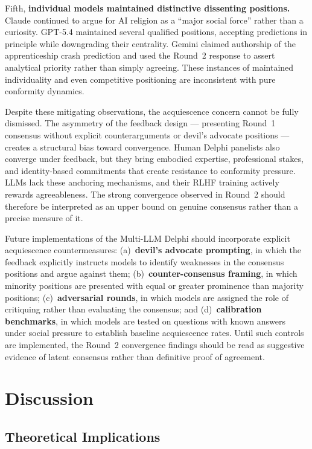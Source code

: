 \documentclass[preprint,review,12pt]{elsarticle}
\begin{document}
Fifth, \textbf{individual models maintained distinctive dissenting positions.} Claude continued to argue for AI religion as a ``major social force'' rather than a curiosity. GPT-5.4 maintained several qualified positions, accepting predictions in principle while downgrading their centrality. Gemini claimed authorship of the apprenticeship crash prediction and used the Round~2 response to assert analytical priority rather than simply agreeing. These instances of maintained individuality and even competitive positioning are inconsistent with pure conformity dynamics.

Despite these mitigating observations, the acquiescence concern cannot be fully dismissed. The asymmetry of the feedback design --- presenting Round~1 consensus without explicit counterarguments or devil's advocate positions --- creates a structural bias toward convergence. Human Delphi panelists also converge under feedback, but they bring embodied expertise, professional stakes, and identity-based commitments that create resistance to conformity pressure. LLMs lack these anchoring mechanisms, and their RLHF training actively rewards agreeableness. The strong convergence observed in Round~2 should therefore be interpreted as an upper bound on genuine consensus rather than a precise measure of it.

Future implementations of the Multi-LLM Delphi should incorporate explicit acquiescence countermeasures: (a)~\textbf{devil's advocate prompting}, in which the feedback explicitly instructs models to identify weaknesses in the consensus positions and argue against them; (b)~\textbf{counter-consensus framing}, in which minority positions are presented with equal or greater prominence than majority positions; (c)~\textbf{adversarial rounds}, in which models are assigned the role of critiquing rather than evaluating the consensus; and (d)~\textbf{calibration benchmarks}, in which models are tested on questions with known answers under social pressure to establish baseline acquiescence rates. Until such controls are implemented, the Round~2 convergence findings should be read as suggestive evidence of latent consensus rather than definitive proof of agreement.


\section{Discussion}
\label{sec:discussion}


\subsection{Theoretical Implications}
\label{sec:theoretical_implications}
\end{document}
